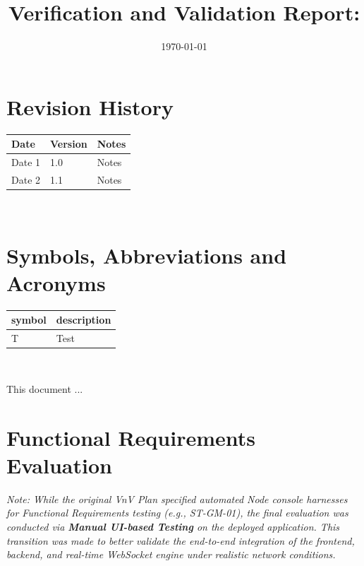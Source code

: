 \documentclass[12pt, titlepage]{article}
\begin{document}
\title{Verification and Validation Report: \progname} 
\author{\authname}
\date{\today}
	
\maketitle


\section{Revision History}

\begin{tabularx}{\textwidth}{p{3cm}p{2cm}X}
\toprule {\bf Date} & {\bf Version} & {\bf Notes}\\
\midrule
Date 1 & 1.0 & Notes\\
Date 2 & 1.1 & Notes\\
\bottomrule
\end{tabularx}

~\newpage

\section{Symbols, Abbreviations and Acronyms}

\renewcommand{\arraystretch}{1.2}
\begin{tabular}{l l} 
  \toprule		
  \textbf{symbol} & \textbf{description}\\
  \midrule 
  T & Test\\
  \bottomrule
\end{tabular}\\


\newpage

\tableofcontents

\listoftables %

\listoffigures %

\newpage


This document ...

\section{Functional Requirements Evaluation}

\textit{Note: While the original VnV Plan specified automated Node console harnesses for Functional Requirements testing (e.g., ST-GM-01), the final evaluation was conducted via \textbf{Manual UI-based Testing} on the deployed application. This transition was made to better validate the end-to-end integration of the frontend, backend, and real-time WebSocket engine under realistic network conditions.}
\end{document}
